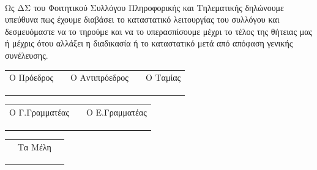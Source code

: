 \documentclass[a4paper,12pt]{report}
\begin{document}
\begin{large}
\paragraph{}
Ως ΔΣ του Φοιτητικού Συλλόγου Πληροφορικής και Τηλεματικής δηλώνουμε υπεύθυνα πως έχουμε διαβάσει το καταστατικό λειτουργίας
του συλλόγου και δεσμευόμαστε να το τηρούμε και να το υπερασπίσουμε μέχρι το τέλος της θήτειας μας ή μέχρις ότου αλλάξει η διαδικασία ή το καταστατικό
μετά από απόφαση γενικής συνέλευσης.
\vspace{0.5cm}

\begin{center}
\begin{tabular}{>{\centering\arraybackslash}p{4.5cm} c >{\centering\arraybackslash}p{4.5cm} c >{\centering\arraybackslash}p{4.5cm}}
\centering
Ο Πρόεδρος && Ο Αντιπρόεδρος && Ο Ταμίας \\
&&&& \\
&&&& \\
\cline{1-1}  \cline{3-3}  \cline{5-5} \\
\end{tabular}
\end{center}

\vspace{0.5cm}

\begin{center}
\begin{tabular}{>{\centering\arraybackslash}p{4.5cm} c >{\centering\arraybackslash}p{4.5cm}}
\centering
Ο Γ.Γραμματέας && Ο Ε.Γραμματέας\\
&& \\
&& \\
\cline{1-1}  \cline{3-3}\\
\end{tabular}
\end{center}

\vspace{0.5cm}

\begin{center}
\begin{tabular}{>{\centering\arraybackslash}p{4.5cm} c >{\centering\arraybackslash}p{4.5cm}}
\centering
&Τα Μέλη&\\
&& \\
&& \\
\cline{1-1}  \cline{3-3}\\
\end{tabular}
\end{center}
\end{large}
\end{document}
